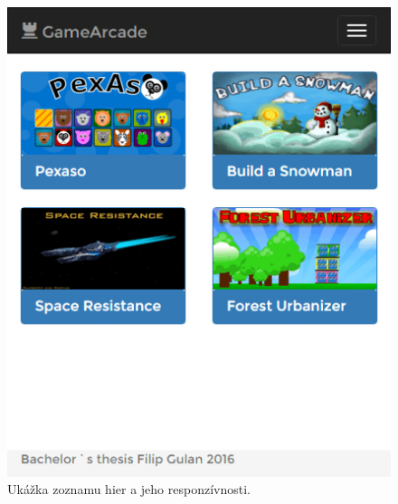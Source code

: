 \begin{figure}[h]
  \centering
  \includegraphics[scale=0.35]{fig/ukazka-responzivity.png}
  \caption{Ukážka zoznamu hier a jeho responzívnosti.}
  \label{fig:ukazka-zoznamhierresponzivny}
\end{figure}


